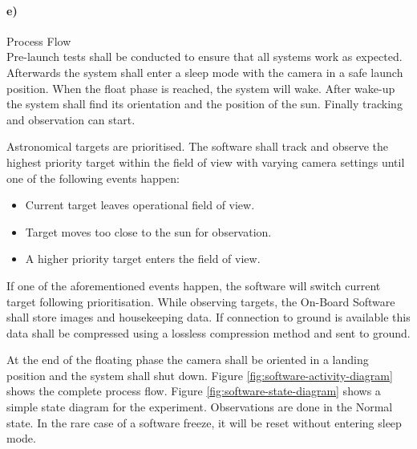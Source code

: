 \paragraph{e)} Process Flow\\

Pre-launch tests shall be conducted to ensure that all systems work as expected. Afterwards the system shall enter a sleep mode with the camera in a safe launch position. When the float phase is reached, the system will wake. After wake-up the system shall find its orientation and the position of the sun. Finally tracking and observation can start.

Astronomical targets are prioritised. The software shall track and observe the highest priority target within the field of view with varying camera settings until one of the following events happen:

\begin{itemize}
	\item Current target leaves operational field of view.
	\item Target moves too close to the sun for observation.
	\item A higher priority target enters the field of view.
\end{itemize}

If one of the aforementioned events happen, the software will switch current target following prioritisation. While observing targets, the On-Board Software shall store images and housekeeping data. If connection to ground is available this data shall be compressed using a lossless compression method and sent to ground.

At the end of the floating phase the camera shall be oriented in a landing position and the system shall shut down. Figure \ref{fig:software-activity-diagram} shows the complete process flow. Figure \ref{fig:software-state-diagram} shows a simple state diagram for the experiment. Observations are done in the Normal state. In the rare case of a software freeze, it will be reset without entering sleep mode. 

